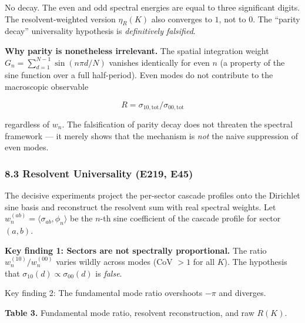 \documentclass[
  11pt,
]{article}
\begin{document}
No decay. The even and odd spectral energies are equal to three significant
digits. The resolvent-weighted version \(\eta_R(K)\) also converges to \(1\),
not to \(0\). The ``parity decay'' universality hypothesis is \emph{definitively
falsified}.

\textbf{Why parity is nonetheless irrelevant.} The spatial integration weight
\(G_n = \sum_{d=1}^{N-1} \sin(n\pi d / N)\) vanishes identically for even \(n\)
(a property of the sine function over a full half-period). Even modes do not
contribute to the macroscopic observable

\[R = \sigma_{10,\mathrm{tot}} / \sigma_{00,\mathrm{tot}}\]

regardless of \(w_n\). The falsification of parity decay does not threaten the
spectral framework --- it merely shows that the mechanism is \emph{not} the
naive suppression of even modes.

\subsubsection{8.3 Resolvent Universality (E219,
E45)}\label{resolvent-universality-e219-e45}

The decisive experiments project the per-sector cascade profiles onto the
Dirichlet sine basis and reconstruct the resolvent sum with real spectral
weights. Let \(w_n^{(ab)} = \langle \sigma_{ab}, \phi_n \rangle\) be the
\(n\)-th sine coefficient of the cascade profile for sector \((a,b)\).

\textbf{Key finding 1: Sectors are not spectrally proportional.} The ratio
\(w_n^{(10)}/w_n^{(00)}\) varies wildly across modes (CoV \(> 1\) for all
\(K\)). The hypothesis that \(\sigma_{10}(d) \propto \sigma_{00}(d)\) is
\emph{false}.

Key finding 2: The fundamental mode ratio overshoots \(-\pi\) and diverges.

\textbf{Table 3.} Fundamental mode ratio, resolvent reconstruction, and raw
\(R(K)\).
\end{document}
